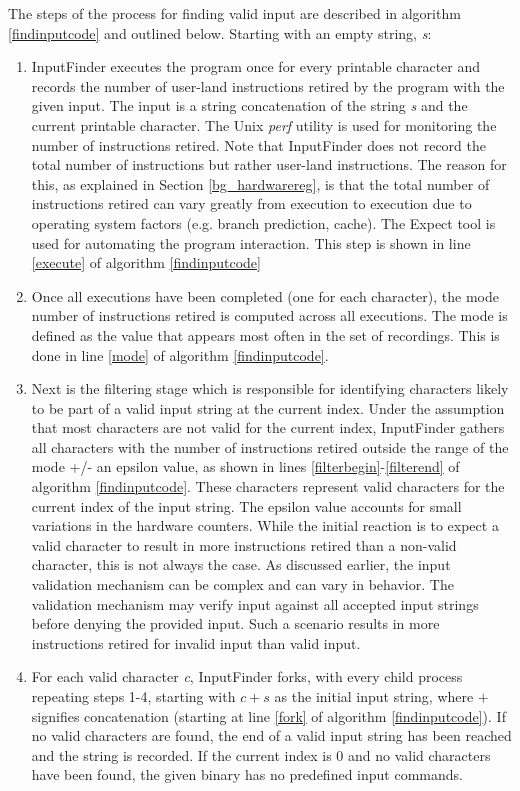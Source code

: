 \documentclass{acm_proc_article-sp}
\def \tool {InputFinder}
\begin{document}
The steps of the process for finding valid input are described in algorithm \ref{findinputcode} and outlined below. Starting with an empty string, \textit{s}:
\begin{enumerate}
\item \tool{} executes the program once for every printable character and records the number of user-land instructions retired by the program with the given input. The input is a string concatenation of the string \textit{s} and the current printable character. The Unix \textit{perf} utility is used for monitoring the number of instructions retired. Note that \tool{} does not record the total number of instructions but rather user-land instructions. The reason for this, as explained in Section \ref{bg_hardwarereg}, is that the total number of instructions retired can vary greatly from execution to execution due to operating system factors (e.g. branch prediction, cache). The Expect tool is used for automating the program interaction. This step is shown in line \ref{execute} of algorithm \ref{findinputcode}
\item Once all executions have been completed (one for each character), the mode number of instructions retired is computed across all executions. The mode is defined as the value that appears most often in the set of recordings. This is done in line \ref{mode} of algorithm \ref{findinputcode}.
\item Next is the filtering stage which is responsible for identifying characters likely to be part of a valid input string at the current index. Under the assumption that most characters are not valid for the current index, \tool{} gathers all characters with the number of instructions retired outside the range of the mode +/- an epsilon value, as shown in lines \ref{filterbegin}-\ref{filterend} of algorithm \ref{findinputcode}. These characters represent valid characters for the current index of the input string. The epsilon value accounts for small variations in the hardware counters. While the initial reaction is to expect a valid character to result in more instructions retired than a non-valid character, this is not always the case. As discussed earlier, the input validation mechanism can be complex and can vary in behavior. The validation mechanism may verify input against all accepted input strings before denying the provided input. Such a scenario results in more instructions retired for invalid input than valid input.
\item For each valid character \textit{c}, \tool{} forks, with every child process repeating steps 1-4, starting with $ c + s $ as the initial input string, where $+$ signifies concatenation (starting at line \ref{fork} of algorithm \ref{findinputcode}). If no valid characters are found, the end of a valid input string has been reached and the string is recorded. If the current index is 0 and no valid characters have been found, the given binary has no predefined input commands.
\end{enumerate}
\end{document}
